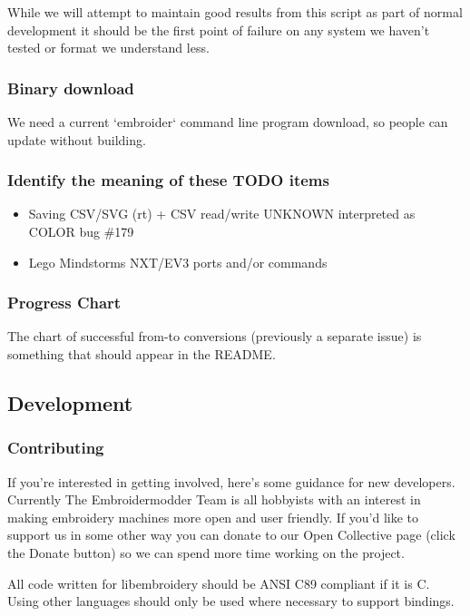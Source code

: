 \documentclass[a4paper, 11pt]{report}
\begin{document}
While we will attempt to maintain good results from this script as part of normal development it should be the first point of failure on any system we haven't tested or format we understand less.



\subsubsection{Binary download}

We need a current `embroider` command line program download, so people can update
without building.

\subsubsection{Identify the meaning of these TODO items}

\begin{itemize}
\item Saving CSV/SVG (rt) + CSV read/write UNKNOWN interpreted as COLOR bug \#179
\item Lego Mindstorms NXT/EV3 ports and/or commands
\end{itemize}

\subsubsection{Progress Chart}

The chart of successful from-to conversions (previously a separate issue)
is something that should appear in the README.

\subsection{Development}

\subsubsection{Contributing}

If you're interested in getting involved, here's some guidance
for new developers. Currently The Embroidermodder Team is all
hobbyists with an interest in making embroidery machines more
open and user friendly. If you'd like to support us in some other way
you can donate to our Open Collective page (click the Donate button) so
we can spend more time working on the project.

All code written for libembroidery should be ANSI C89 compliant
if it is C. Using other languages should only be used where
necessary to support bindings.
\end{document}
